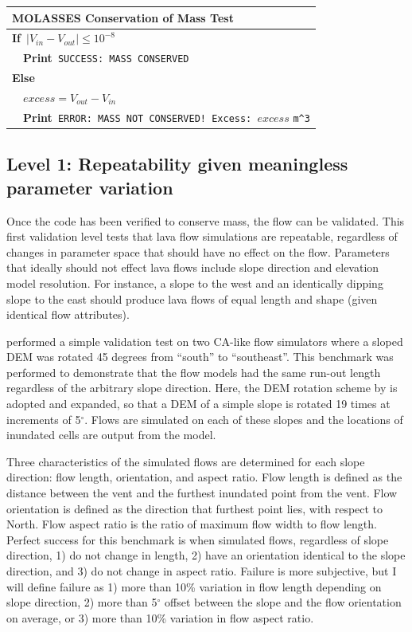 \documentclass[12pt,letter]{article}
\begin{document}
			\begin{center}
				\begin{tabular}{l}
					\toprule
					\textbf{MOLASSES Conservation of Mass Test}\\
					\midrule
					\textbf{If}~$|V_{in}-V_{out}| \le 10^{-8}$\\
					~~\textbf{Print}~\verb|SUCCESS: MASS CONSERVED|\\
					\textbf{Else}\\
					~~$excess = V_{out}-V_{in}$\\
					~~\textbf{Print}~\verb|ERROR: MASS NOT CONSERVED! Excess: |$excess$ \verb|m^3|\\
					\bottomrule
				\end{tabular}
			\end{center}

	\subsection{Level 1: Repeatability given meaningless parameter variation}
		Once the code has been verified to conserve mass, the flow can be validated. This first validation level tests that lava flow simulations are repeatable, regardless of changes in parameter space that should have no effect on the flow. Parameters that ideally should not effect lava flows include slope direction and elevation model resolution. For instance, a slope to the west and an identically dipping slope to the east should produce lava flows of equal length and shape (given identical flow attributes).
		
		\citet{miyamoto1997simulating} performed a simple validation test on two CA-like flow simulators \citep{ishihara1990numerical,miyamoto1997simulating} where a sloped DEM was rotated 45 degrees from ``south'' to ``southeast''. This benchmark was performed to demonstrate that the flow models had the same run-out length regardless of the arbitrary slope direction. Here, the DEM rotation scheme by \citet{miyamoto1997simulating} is adopted and expanded, so that a DEM of a simple slope is rotated 19 times at increments of 5$^{\circ}$. Flows are simulated on each of these slopes and the locations of inundated cells are output from the model.
		
		Three characteristics of the simulated flows are determined for each slope direction: flow length, orientation, and aspect ratio. Flow length is defined as the distance between the vent and the furthest inundated point from the vent. Flow orientation is defined as the direction that furthest point lies, with respect to North. Flow aspect ratio is the ratio of maximum flow width to flow length. Perfect success for this benchmark is when simulated flows, regardless of slope direction, 1) do not change in length, 2) have an orientation identical to the slope direction, and 3) do not change in aspect ratio. Failure is more subjective, but I will define failure as 1) more than 10\% variation in flow length depending on slope direction, 2) more than 5$^{\circ}$ offset between the slope and the flow orientation on average, or 3) more than 10\% variation in flow aspect ratio.
		
\end{document}
